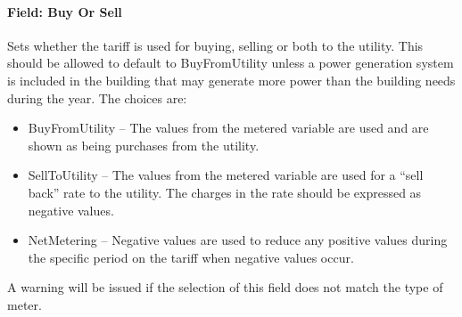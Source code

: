 \paragraph{Field: Buy Or Sell}\label{field-buy-or-sell}

Sets whether the tariff is used for buying, selling or both to the utility. This should be allowed to default to BuyFromUtility unless a power generation system is included in the building that may generate more power than the building needs during the year. The choices are:

\begin{itemize}
\item
  BuyFromUtility -- The values from the metered variable are used and are shown as being purchases from the utility.
\item
  SellToUtility -- The values from the metered variable are used for a ``sell back'' rate to the utility. The charges in the rate should be expressed as negative values.
\item
  NetMetering -- Negative values are used to reduce any positive values during the specific period on the tariff when negative values occur.
\end{itemize}

A warning will be issued if the selection of this field does not match the type of meter.